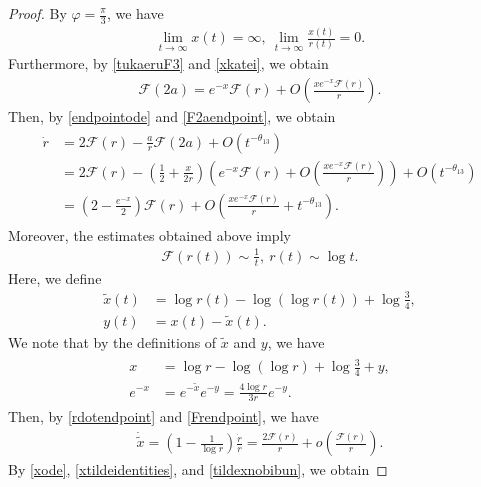 \documentclass[reqno]{amsart}
\theoremstyle{plain}
\theoremstyle{definition}
\numberwithin{equation}{section}
\begin{document}
\begin{proof}
By $\varphi=\frac{\pi}{3}$, we have
\begin{align}\label{xkatei}
\lim_{t\to\infty}x(t)=\infty,\ \lim_{t\to\infty}\frac{x(t)}{r(t)}=0.
\end{align}
Furthermore, by \eqref{tukaeruF3} and \eqref{xkatei}, we obtain
\begin{align}\label{F2aendpoint}
\mathcal{F}(2a)=e^{-x}\mathcal{F}(r)+O\left(\frac{xe^{-x}\mathcal{F}(r)}{r}\right).
\end{align}
Then, by \eqref{endpointode} and \eqref{F2aendpoint}, we obtain
\begin{align}\label{rdotendpoint}
\begin{aligned}
\dot{r}&=2\mathcal{F}(r)-\frac{a}{r}\mathcal{F}(2a)+O\left(t^{-\theta_{13}}\right)
\\
&=2\mathcal{F}(r)-\left(\frac{1}{2}+\frac{x}{2r}\right)\left(e^{-x}\mathcal{F}(r)+O\left(\frac{xe^{-x}\mathcal{F}(r)}{r}\right)\right)+O\left(t^{-\theta_{13}}\right)
\\
&=\left(2-\frac{e^{-x}}{2}\right)\mathcal{F}(r)+O\left(\frac{xe^{-x}\mathcal{F}(r)}{r}+t^{-\theta_{13}}\right).
\end{aligned}
\end{align}
Moreover, the estimates obtained above imply
\begin{align}\label{Frendpoint}
\mathcal{F}(r(t))\sim\frac{1}{t},\ r(t)\sim\log{t}.
\end{align}
Here, we define
\begin{align*}
\tilde{x}(t)&=\log{r(t)}-\log{(\log{r(t)})}+\log{\frac{3}{4}},
\\
y(t)&=x(t)-\tilde{x}(t).
\end{align*}
We note that by the definitions of $\tilde{x}$ and $y$, we have
\begin{align}\label{xtildeidentities}
\begin{aligned}
x&=\log{r}-\log{(\log{r})}+\log{\frac{3}{4}}+y,
\\
e^{-x}&=e^{-\tilde{x}}e^{-y}=\frac{4\log{r}}{3r}e^{-y}.
\end{aligned}
\end{align}
Then, by \eqref{rdotendpoint} and \eqref{Frendpoint}, we have
\begin{align}\label{tildexnobibun}
\dot{\tilde{x}}=\left(1-\frac{1}{\log{r}}\right)\frac{\dot{r}}{r}=\frac{2\mathcal{F}(r)}{r}+o\left(\frac{\mathcal{F}(r)}{r}\right).
\end{align}
By \eqref{xode}, \eqref{xtildeidentities}, and \eqref{tildexnobibun}, we obtain

\end{proof}
\end{document}
